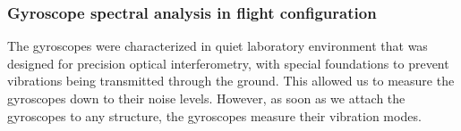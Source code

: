 \subsubsection{Gyroscope spectral analysis in flight configuration}

The gyroscopes were characterized in quiet laboratory environment that was designed for precision optical interferometry, with special foundations to prevent vibrations being transmitted through the ground. This allowed us to measure the gyroscopes down to their noise levels. However, as soon as we attach the gyroscopes to any structure, the gyroscopes measure their vibration modes. 



